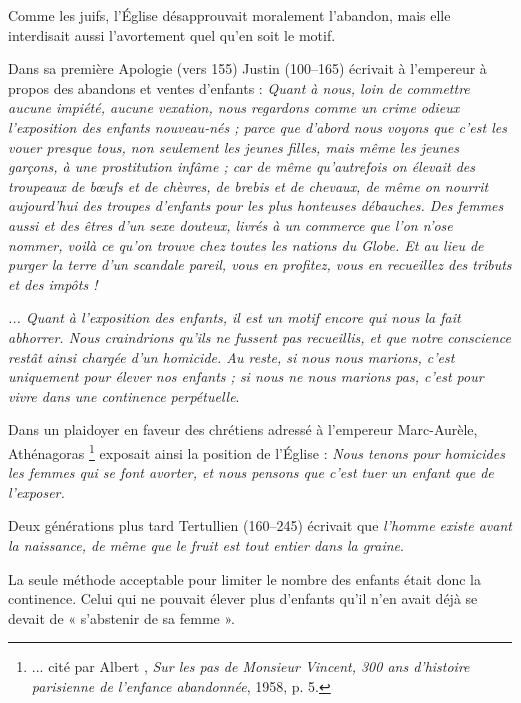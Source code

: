  Comme les juifs, l'Église désapprouvait moralement l'abandon, mais elle interdisait aussi l'avortement quel qu'en soit le motif. 

 Dans sa première Apologie (vers 155) Justin (100--165) écrivait à l'empereur à propos des abandons et ventes d'enfants : \emph{Quant à nous, loin de commettre aucune impiété, aucune vexation, nous regardons comme un crime odieux l'exposition des enfants nouveau-nés ; parce que d'abord nous voyons que c'est les vouer presque tous, non seulement les jeunes filles, mais même les jeunes garçons, à une prostitution infâme ; car de même qu'autrefois on élevait des troupeaux de bœufs et de chèvres, de brebis et de chevaux, de même on nourrit aujourd'hui des troupes d'enfants pour les plus honteuses débauches. Des femmes aussi et des êtres d'un sexe douteux, livrés à un commerce que l'on n'ose nommer, voilà ce qu'on trouve chez toutes les nations du Globe. Et au lieu de purger la terre d'un scandale pareil, vous en profitez, vous en recueillez des tributs et des impôts !}

 \emph{... Quant à l'exposition des enfants, il est un motif encore qui nous la fait abhorrer. Nous craindrions qu'ils ne fussent pas recueillis, et que notre conscience restât ainsi chargée d'un homicide. Au reste, si nous nous marions, c'est uniquement pour élever nos enfants ; si nous ne nous marions pas, c'est pour vivre dans une continence perpétuelle}.

 Dans un plaidoyer en faveur des chrétiens adressé à l'empereur Marc-Aurèle, Athénagoras%
\footnote{... cité par Albert , \emph{Sur les pas de Monsieur Vincent, 300 ans d'histoire parisienne de l'enfance abandonnée}, 1958, p. 5.}
exposait ainsi la position de l'Église : \emph{Nous tenons pour homicides les femmes qui se font avorter, et nous pensons que c'est tuer un enfant que de l'exposer.} 

 Deux générations plus tard Tertullien (160--245) écrivait que \emph{l'homme existe avant la naissance, de même que le fruit est tout entier dans la graine}. 

 La seule méthode acceptable pour limiter le nombre des enfants était donc la continence. Celui qui ne pouvait élever plus d'enfants qu'il n'en avait déjà se devait de « s'abstenir de sa femme ».
 


 

